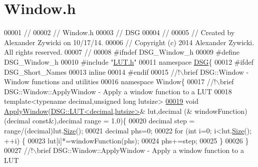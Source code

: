 \hypertarget{_window_8h_source}{\section{Window.\+h}
\label{_window_8h_source}
}

\begin{DoxyCode}
00001 \textcolor{comment}{//}
00002 \textcolor{comment}{//  Window.h}
00003 \textcolor{comment}{//  DSG}
00004 \textcolor{comment}{//}
00005 \textcolor{comment}{//  Created by Alexander Zywicki on 10/17/14.}
00006 \textcolor{comment}{//  Copyright (c) 2014 Alexander Zywicki. All rights reserved.}
00007 \textcolor{comment}{//}
00008 \textcolor{preprocessor}{#ifndef DSG\_Window\_h}
00009 \textcolor{preprocessor}{#define DSG\_Window\_h}
00010 \textcolor{preprocessor}{#include "\hyperlink{_l_u_t_8h}{LUT.h}"}
00011 \textcolor{keyword}{namespace }\hyperlink{namespace_d_s_g}{DSG}\{
00012 \textcolor{preprocessor}{#ifdef DSG\_Short\_Names}
00013     \textcolor{keyword}{inline}
00014 \textcolor{preprocessor}{#endif}
00015 \textcolor{comment}{    //!\(\backslash\)brief DSG::Window - Window functions and utilities}
00016 \textcolor{comment}{}    \textcolor{keyword}{namespace }Window\{\textcolor{comment}{}
00017 \textcolor{comment}{        //!\(\backslash\)brief DSG::Window::ApplyWindow - Apply a window function to a LUT}
00018 \textcolor{comment}{}        \textcolor{keyword}{template}<\textcolor{keyword}{typename} decimal,\textcolor{keywordtype}{unsigned} \textcolor{keywordtype}{long} lutsize>
\hypertarget{_window_8h_source_l00019}{}\hyperlink{namespace_d_s_g_1_1_window_ab3ab521b2e0d85dc752ccc42e642b203}{00019}         \textcolor{keywordtype}{void} \hyperlink{namespace_d_s_g_1_1_window_ab3ab521b2e0d85dc752ccc42e642b203}{ApplyWindow}(\hyperlink{class_d_s_g_1_1_l_u_t}{DSG::LUT<decimal,lutsize>}& lut,decimal (&
      windowFunction)(decimal \textcolor{keyword}{const}&),decimal range = 1.0)\{
00020             decimal step = range/(decimal)lut.\hyperlink{class_d_s_g_1_1_l_u_t_a2d1a2112f9e960c7b70882a19d670ff9}{Size}();
00021             decimal phs=0;
00022             \textcolor{keywordflow}{for} (\textcolor{keywordtype}{int} i=0; i<lut.\hyperlink{class_d_s_g_1_1_l_u_t_a2d1a2112f9e960c7b70882a19d670ff9}{Size}(); ++i) \{
00023                 lut[i]*=windowFunction(phs);
00024                 phs+=step;
00025             \}
00026         \}\textcolor{comment}{}
00027 \textcolor{comment}{        //!\(\backslash\)brief DSG::Window::ApplyWindow - Apply a window function to a LUT}

\end{DoxyCode}
